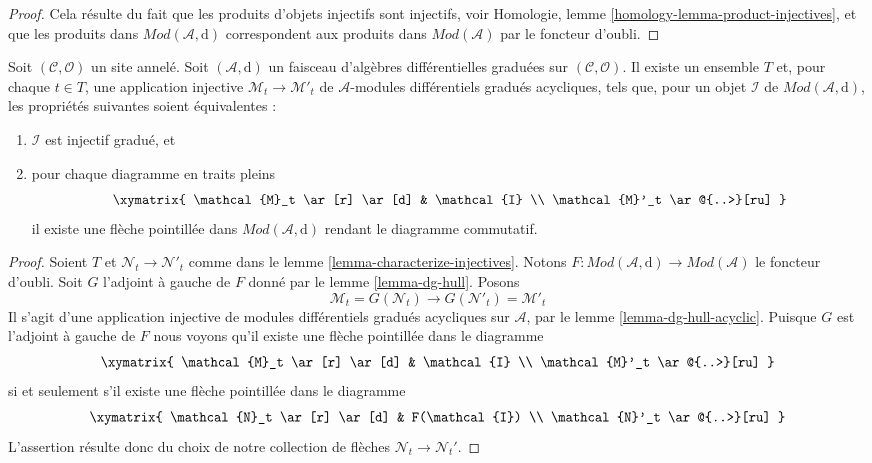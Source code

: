 \begin{proof}
Cela résulte du fait que les produits d'objets injectifs sont injectifs, voir Homologie, lemme \ref{homology-lemma-product-injectives}, et que les produits dans $\textit{Mod}(\mathcal{A}, \text{d})$ correspondent aux produits dans $\textit{Mod}(\mathcal{A})$ par le foncteur d'oubli.
\end{proof}

\begin{lemma}
\label{lemma-characterize-graded-injectives-in-dg}
Soit $(\mathcal{C}, \mathcal{O})$ un site annelé.
Soit $(\mathcal{A}, \text{d})$ un faisceau d'algèbres différentielles graduées sur $(\mathcal{C}, \mathcal{O})$.
Il existe un ensemble $T$ et, pour chaque $t \in T$, une application injective $\mathcal{M}_t \to \mathcal{M}'_t$ de $\mathcal{A}$-modules différentiels gradués acycliques, tels que, pour un objet $\mathcal{I}$ de $\textit{Mod}(\mathcal{A}, \text{d})$, les propriétés suivantes soient équivalentes :
\begin{enumerate}
\item $\mathcal{I}$ est injectif gradué, et \item pour chaque diagramme en traits pleins
$$
\xymatrix{
\mathcal{M}_t \ar[r] \ar[d] & \mathcal{I} \\
\mathcal{M}'_t \ar@{..>}[ru]
}
$$
il existe une flèche pointillée dans $\textit{Mod}(\mathcal{A}, \text{d})$ rendant le diagramme commutatif.
\end{enumerate}
\end{lemma}

\begin{proof}
Soient $T$ et $\mathcal{N}_t \to \mathcal{N}'_t$ comme dans le lemme \ref{lemma-characterize-injectives}.
Notons $F : \textit{Mod}(\mathcal{A}, \text{d}) \to \textit{Mod}(\mathcal{A})$ le foncteur d'oubli.
Soit $G$ l'adjoint à gauche de $F$ donné par le lemme \ref{lemma-dg-hull}.
Posons
$$
\mathcal{M}_t = G(\mathcal{N}_t) \to
G(\mathcal{N}'_t) = \mathcal{M}'_t
$$
Il s'agit d'une application injective de modules différentiels gradués acycliques sur $\mathcal{A}$, par le lemme \ref{lemma-dg-hull-acyclic}.
Puisque $G$ est l'adjoint à gauche de $F$ nous voyons qu'il existe une flèche pointillée dans le diagramme
$$
\xymatrix{
\mathcal{M}_t \ar[r] \ar[d] & \mathcal{I} \\
\mathcal{M}'_t \ar@{..>}[ru]
}
$$
si et seulement s'il existe une flèche pointillée dans le diagramme
$$
\xymatrix{
\mathcal{N}_t \ar[r] \ar[d] & F(\mathcal{I}) \\
\mathcal{N}'_t \ar@{..>}[ru]
}
$$
L'assertion résulte donc du choix de notre collection de flèches $\mathcal{N}_t \to \mathcal{N}_t'$.
\end{proof}


